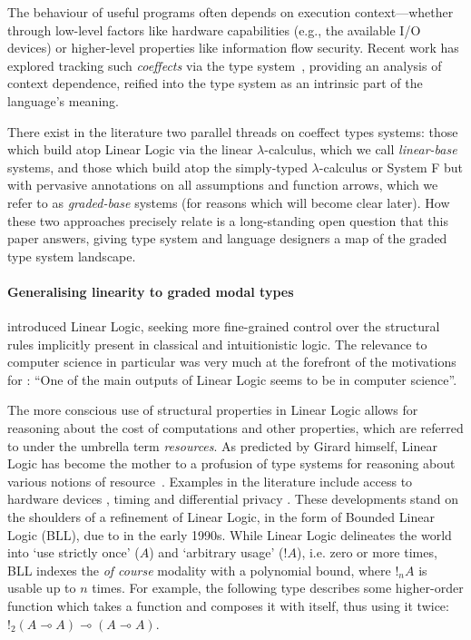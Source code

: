The behaviour of useful programs often depends on execution context---whether through low-level factors like
hardware capabilities (e.g., the available I/O devices) or higher-level properties like information flow security.
Recent work has explored tracking such \emph{coeffects} via the type
system~\cite{DBLP:conf/icalp/PetricekOM13,petricek2014coeffects,brunel2014core,ghica2014bounded},
providing an analysis of context dependence, reified into the type system as an intrinsic part of the
language's meaning.

There exist in the literature two parallel threads on coeffect types systems: those which build atop
Linear Logic via the linear $\lambda$-calculus, which we call \emph{linear-base} systems, and those
which build atop the simply-typed $\lambda$-calculus or System F but with pervasive annotations on
all assumptions and function arrows, which we refer to as \emph{graded-base} systems (for reasons which will
become clear later). How these two approaches precisely relate is a long-standing open question that this paper
answers, giving type system and language designers a map of the graded type system landscape.

\paragraph{Generalising linearity to graded modal types}

\citet{girard1987linear} introduced Linear Logic, seeking
more fine-grained control over the structural rules
implicitly present in classical and intuitionistic logic. The relevance to computer science in
particular was very much at the forefront of the motivations for \citet{girard1987linear}: ``One of the main outputs of
Linear Logic seems to be in computer science''.

The more conscious use of structural properties in Linear Logic allows for reasoning about the cost
of computations and other properties, which are referred to under the umbrella term
\emph{resources}. As predicted by Girard himself, Linear Logic has become the mother to a profusion
of type systems for reasoning about various notions of resource~\cite{walker2005substructural}. Examples in the literature
include access to hardware devices \cite{DBLP:conf/icalp/PetricekOM13}, timing \cite{ghica2014bounded} and differential privacy
\cite{gaboardi2013linear}. These developments stand on the shoulders of a refinement of Linear
Logic, in the form of Bounded Linear Logic (BLL), due to \citet{girard1992bounded} in
the early 1990s. While Linear Logic delineates the world into `use strictly once' ($A$) and
`arbitrary usage' ($!A$), i.e. zero or more times, BLL indexes the \textit{of course} modality with a
polynomial bound, where $!_{n}A$ is usable up to $n$ times.
For example, the following type describes some higher-order function which
takes a function and composes it with itself, thus using it twice:
$!_2 (A \multimap A) \multimap (A \multimap A)$.

